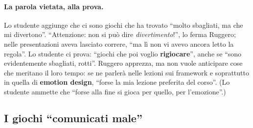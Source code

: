\paragraph{La parola vietata, alla prova.} Lo studente aggiunge che ci sono giochi
che ha trovato ``molto sbagliati, ma che mi divertono''. ``Attenzione: non si può
dire \emph{divertimento}!'', lo ferma Ruggero; nelle presentazioni aveva lasciato
correre, ``ma lì non vi avevo ancora letto la regola''. Lo studente ci prova:
``giochi che poi voglio \textbf{rigiocare}'', anche se ``sono evidentemente
sbagliati, rotti''. Ruggero apprezza, ma non vuole anticipare cose che meritano il
loro tempo: se ne parlerà nelle lezioni sui framework e soprattutto in quella di
\textbf{emotion design}, ``forse la mia lezione preferita del corso''. (Lo
studente ammette che ``forse alla fine si gioca per quello, per l'emozione''.)

\subsection{I giochi ``comunicati male''}

